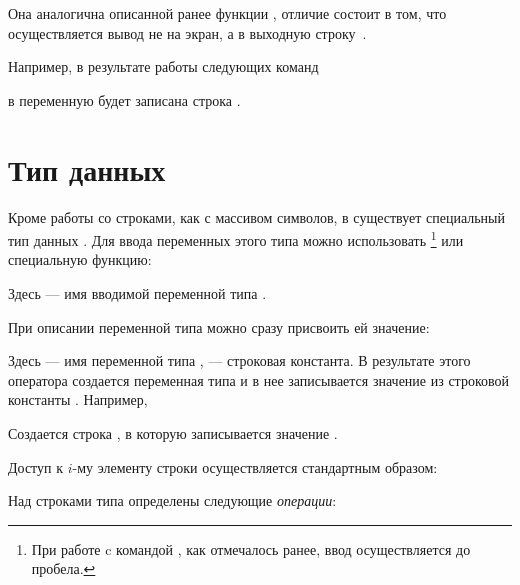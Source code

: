 
Она аналогична описанной ранее функции , отличие состоит в том, что осуществляется вывод не на
экран, а в выходную строку~.

Например, в результате работы следующих команд



в переменную  будет записана строка .

\section[Тип данных string]{Тип данных }\label{ch08:3}
Кроме работы со строками, как с массивом символов, в  существует специальный тип данных .
Для ввода переменных этого типа можно использовать \footnote{При работе c командой
, как отмечалось ранее, ввод осуществляется до пробела.} или специальную функцию:


Здесь  --- имя вводимой переменной типа .

При описании переменной типа  можно сразу присвоить ей значение:


Здесь  --- имя переменной типа ,  --- строковая
константа. В результате этого оператора создается переменная  типа  и в
нее записывается значение из строковой константы . Например,


Создается строка , в которую записывается значение .

Доступ к $i$-му элементу строки осуществляется стандартным образом:


Над строками типа  определены следующие \emph{операции}:

